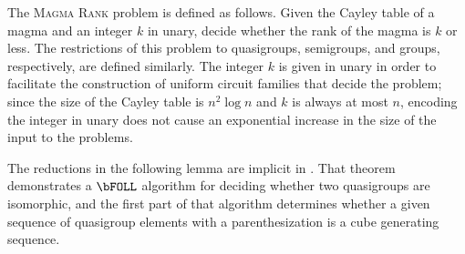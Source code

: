 \documentclass{article}
\DeclareMathOperator{\cube}{cube}
\DeclareMathOperator{\rank}{rank}
\begin{document}

The \textsc{Magma Rank} problem is defined as follows.
Given the Cayley table of a magma and an integer $k$ in unary, decide whether the rank of the magma is $k$ or less.
The restrictions of this problem to quasigroups, semigroups, and groups, respectively, are defined similarly.
The integer $k$ is given in unary in order to facilitate the construction of uniform circuit families that decide the problem; since the size of the Cayley table is $n^2 \log n$ and $k$ is always at most $n$, encoding the integer in unary does not cause an exponential increase in the size of the input to the problems.

The reductions in the following lemma are implicit in \autocite[Theorem~3.4]{ctw13}.
That theorem demonstrates a $\bFOLL$ algorithm for deciding whether two quasigroups are isomorphic, and the first part of that algorithm determines whether a given sequence of quasigroup elements with a parenthesization is a cube generating sequence.
\end{document}
